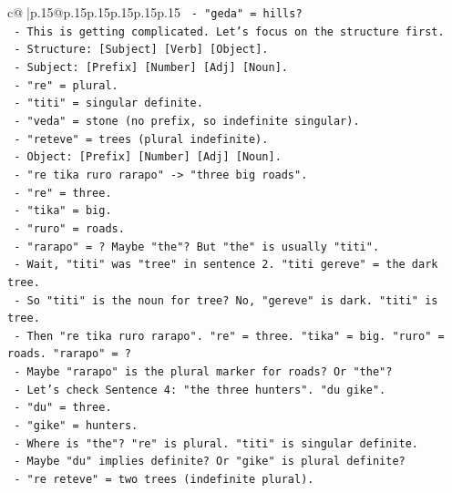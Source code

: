 \documentclass{article}
\begin{document}
{\begin{supertabular}{c@{$\;$}|p{.15\linewidth}@{}p{.15\linewidth}p{.15\linewidth}p{.15\linewidth}p{.15\linewidth}p{.15\linewidth}}
{{{\texttt{        {-} "geda" = hills?} \\
\texttt{      {-} This is getting complicated. Let's focus on the structure first.} \\
\texttt{      {-} Structure: {[}Subject{]} {[}Verb{]} {[}Object{]}.} \\
\texttt{      {-} Subject: {[}Prefix{]} {[}Number{]} {[}Adj{]} {[}Noun{]}.} \\
\texttt{        {-} "re" = plural.} \\
\texttt{        {-} "titi" = singular definite.} \\
\texttt{        {-} "veda" = stone (no prefix, so indefinite singular).} \\
\texttt{        {-} "reteve" = trees (plural indefinite).} \\
\texttt{      {-} Object: {[}Prefix{]} {[}Number{]} {[}Adj{]} {[}Noun{]}.} \\
\texttt{        {-} "re tika ruro rarapo" {-}> "three big roads".} \\
\texttt{          {-} "re" = three.} \\
\texttt{          {-} "tika" = big.} \\
\texttt{          {-} "ruro" = roads.} \\
\texttt{          {-} "rarapo" = ? Maybe "the"? But "the" is usually "titi".} \\
\texttt{          {-} Wait, "titi" was "tree" in sentence 2. "titi gereve" = the dark tree.} \\
\texttt{          {-} So "titi" is the noun for tree? No, "gereve" is dark. "titi" is tree.} \\
\texttt{          {-} Then "re tika ruro rarapo". "re" = three. "tika" = big. "ruro" = roads. "rarapo" = ?} \\
\texttt{          {-} Maybe "rarapo" is the plural marker for roads? Or "the"?} \\
\texttt{          {-} Let's check Sentence 4: "the three hunters". "du gike".} \\
\texttt{            {-} "du" = three.} \\
\texttt{            {-} "gike" = hunters.} \\
\texttt{            {-} Where is "the"? "re" is plural. "titi" is singular definite.} \\
\texttt{            {-} Maybe "du" implies definite? Or "gike" is plural definite?} \\
\texttt{            {-} "re reteve" = two trees (indefinite plural).} \\
}}}
\end{supertabular}}
\end{document}
